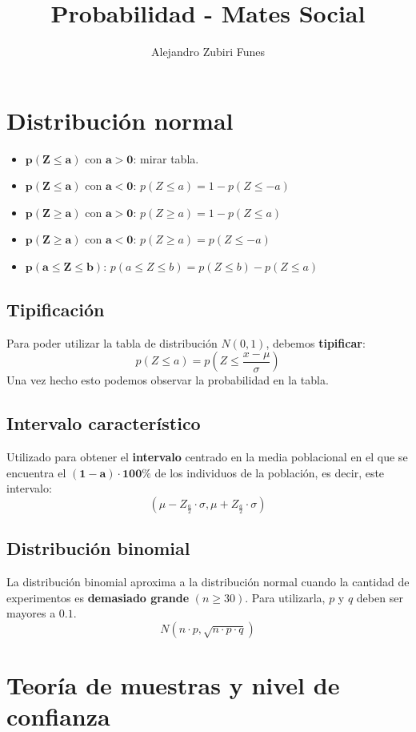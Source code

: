 \documentclass{article}
\title{Probabilidad - Mates Social}
\author{Alejandro Zubiri Funes}
\date{}
\begin{document}
\maketitle
\section*{Distribución normal}
\begin{itemize}
    \item $\bm{p(Z\leq a)}$ con $\bm{a>0}$: mirar tabla.
    \item $\bm{p(Z\leq a)}$ con $\bm{a<0}$: $p(Z\leq a)= 1-p(Z\leq -a)$
    \item $\bm{p(Z\geq a)}$ con $\bm{a>0}$: $p(Z\geq a)=1-p(Z\leq a)$
    \item $\bm{p(Z\geq a)}$ con $\bm{a<0}$: $p(Z\geq a)=p(Z\leq -a)$
    \item $\bm{p(a\leq Z \leq b)}$: $p(a\leq Z \leq b)= p(Z\leq b)-p(Z\leq a)$
\end{itemize}
\subsection*{Tipificación}
Para poder utilizar la tabla de distribución $N(0,1)$, debemos \textbf{tipificar}:
\[
    p(Z\leq a)=p(Z\leq \frac{x-\mu}{\sigma})
\]
Una vez hecho esto podemos observar la probabilidad en la tabla.

\subsection*{Intervalo característico}
Utilizado para obtener el \textbf{intervalo} centrado en la media poblacional en el que se encuentra el $\bm{(1-a)\cdot 100\%}$ de los individuos de la población,
es decir, este intervalo:
\[
    (\mu-Z_{\frac{a}{2}}\cdot \sigma, \mu+Z_{\frac{a}{2}}\cdot \sigma)
\]

\subsection*{Distribución binomial}
La distribución binomial aproxima a la distribución normal cuando la cantidad de experimentos es \textbf{demasiado grande} $(n\geq 30)$. Para utilizarla,
$p$ y $q$ deben ser mayores a $0.1$.
\[
    N(n\cdot p, \sqrt{n\cdot p\cdot q})
\]

\section*{Teoría de muestras y nivel de confianza}
\end{document}

